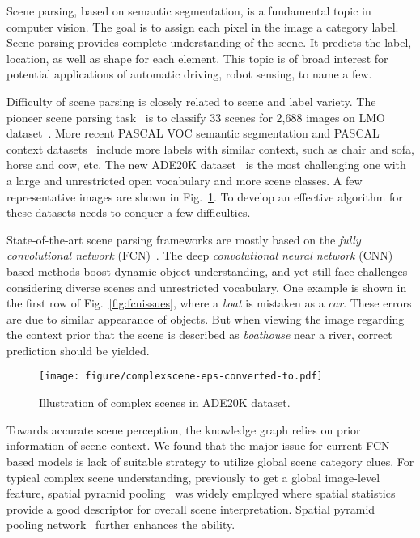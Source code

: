 \documentclass[10pt,twocolumn,letterpaper]{article}
\begin{document}
Scene parsing, based on semantic segmentation, is a fundamental topic in computer vision.
The goal is to assign each pixel in the image a category label. Scene parsing provides
complete understanding of the scene. It predicts the label, location, as well as shape
for each element. This topic is of broad interest for potential applications of automatic
driving, robot sensing, to name a few.

Difficulty of scene parsing is closely related to scene and label variety. The pioneer
scene parsing task~\cite{liu2011nonparametric} is to classify 33 scenes for 2,688 images
on LMO dataset~\cite{liu2009nonparametric}. More recent PASCAL VOC semantic segmentation
and PASCAL context datasets~\cite{everingham2010pascal,mottaghi2014role} include more
labels with similar context, such as chair and sofa, horse and cow, etc. The new ADE20K
dataset~\cite{zhou2016semantic} is the most challenging one with a large and unrestricted
open vocabulary and more scene classes. A few representative images are shown in
Fig.~\ref{fig:intro}. To develop an effective algorithm for these datasets needs to
conquer a few difficulties.

State-of-the-art scene parsing frameworks are mostly based on the {\it fully
convolutional network} (FCN)~\cite{long2015fully}. The deep {\it convolutional neural
network} (CNN) based methods boost dynamic object understanding, and yet still face
challenges considering diverse scenes and unrestricted vocabulary. One example is shown
in the first row of Fig.~\ref{fig:fcnissues}, where a {\it boat} is mistaken as a {\it
car}. These errors are due to similar appearance of objects. But when viewing the image
regarding the context prior that the scene is described as {\it boathouse} near a river,
correct prediction should be yielded.

\begin{figure}[t]
\centering
\texttt{[image: figure/complexscene-eps-converted-to.pdf]}
\caption{Illustration of complex scenes in ADE20K dataset. } \label{fig:intro}
\end{figure}

Towards accurate scene perception, the knowledge graph relies on prior information of
scene context. We found that the major issue for current FCN based models is lack of
suitable strategy to utilize global scene category clues. For typical complex scene
understanding, previously to get a global image-level feature, spatial pyramid
pooling~\cite{lazebnik2006beyond} was widely employed where spatial statistics provide a
good descriptor for overall scene interpretation. Spatial pyramid pooling
network~\cite{he2014spatial} further enhances the ability.
\end{document}
